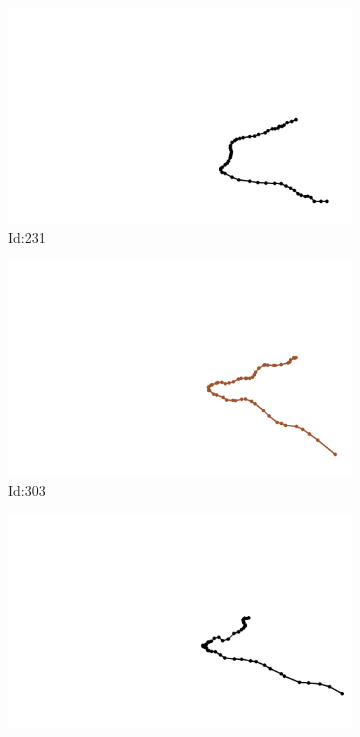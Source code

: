 \documentclass[12pt,twoside]{report}
\begin{document}
\begin{figure}
\centering
\begin{subfigure}[b]{0.20\textwidth}
\centering
\includegraphics[width=\textwidth]{../../trajectories/231.png}
\caption{Id:231}
\end{subfigure}
\begin{subfigure}[b]{0.20\textwidth}
\centering
\includegraphics[width=\textwidth]{../../trajectories/303.png}
\caption{Id:303}
\end{subfigure}
\begin{subfigure}[b]{0.20\textwidth}
\centering
\includegraphics[width=\textwidth]{../../trajectories/343.png}

\end{subfigure}
\end{figure}
\end{document}
